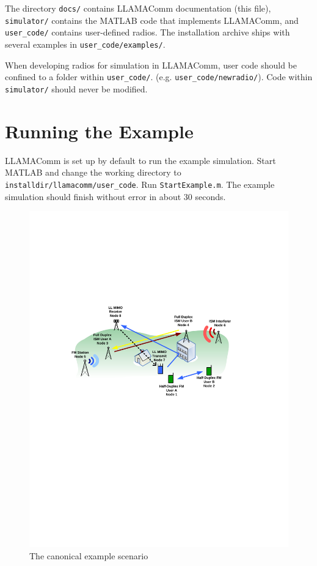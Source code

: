 The directory \verb+docs/+ contains LLAMAComm documentation (this
file), \verb+simulator/+ contains the MATLAB code that implements
LLAMAComm, and \verb+user_code/+ contains user-defined radios.  The
installation archive ships with several examples in \verb+user_code/examples/+.

When developing radios for simulation in LLAMAComm, user code should
be confined to a folder within \verb+user_code/+. (e.g.
\verb+user_code/newradio/+).  
Code within
\verb+simulator/+ should never be modified.

\section{Running the Example}

LLAMAComm is set up by default to run the example simulation.  Start
MATLAB and change the working directory to
\verb+installdir/llamacomm/user_code+. Run \verb+StartExample.m+. The example
simulation should finish without error in about 30 seconds.

\begin{figure}[h]
\centering
\includegraphics[width=6in]{figs/Canonical_Scenario}
\caption{The canonical example scenario}
\label{fig:canonicalEx}
\end{figure}

